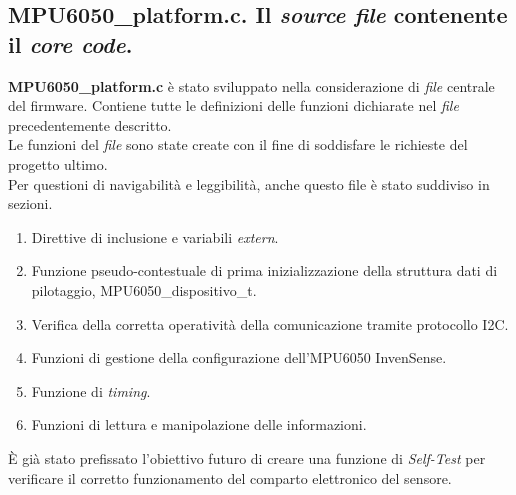 \documentclass[11pt]{report}
\begin{document}
\newpage

\newpage

\subsection{MPU6050\_platform.c. Il \textit{source file} contenente il \textit{core code}.}
\textbf{MPU6050\_platform.c} è stato sviluppato nella considerazione di \textit{file} centrale del firmware. Contiene tutte le definizioni delle funzioni dichiarate nel \textit{file} precedentemente descritto.\\
Le funzioni del \textit{file} sono state create con il fine di soddisfare le richieste del progetto ultimo.\\
Per questioni di navigabilità e leggibilità, anche questo file è stato suddiviso in sezioni.\\
\begin{enumerate}
    \item Direttive di inclusione e variabili \textit{extern}.
    \item Funzione pseudo-contestuale di prima inizializzazione della struttura dati di pilotaggio, MPU6050\_dispositivo\_t.
    \item Verifica della corretta operatività della comunicazione tramite protocollo I2C.
    \item Funzioni di gestione della configurazione dell'MPU6050 InvenSense.
    \item Funzione di \textit{timing}.
    \item Funzioni di lettura e manipolazione delle informazioni.  
\end{enumerate}
È già stato prefissato l'obiettivo futuro di creare una funzione di \textit{Self-Test} per verificare il corretto funzionamento del comparto elettronico del sensore.
\end{document}
